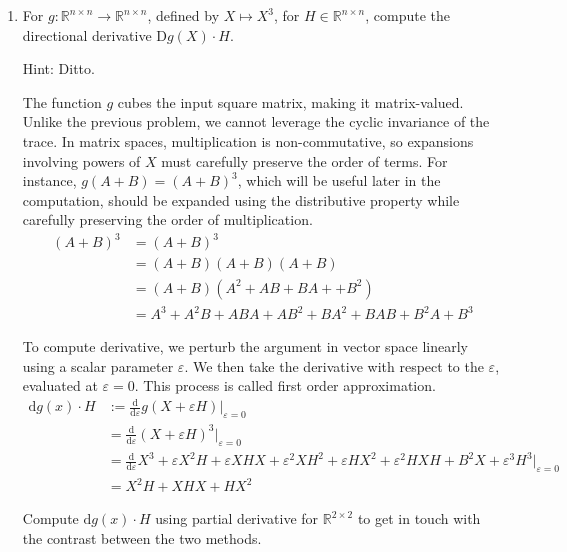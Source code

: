 \documentclass{article}
\begin{document}
\begin{enumerate}[start=9]
  \item For $g:\mathbb{R}^{n\times n}\rightarrow\mathbb{R}^{n\times n}$, defined by $X\mapsto X^{3}$, for $H\in\mathbb{R}^{n\times n}$, compute the directional derivative D$g(X)\cdot H$.

  {\footnotesize Hint: Ditto.}

  \begin{ans_box}
    The function $g$ cubes the input square matrix, making it matrix-valued. Unlike the previous problem, we cannot leverage the cyclic invariance of the trace. In matrix spaces, multiplication is non-commutative, so expansions involving powers of $X$ must carefully preserve the order of terms. For instance, $g(A+B)=(A+B)^{3}$, which will be useful later in the computation, should be expanded using the distributive property while carefully preserving the order of multiplication.\medskip
    \begin{equation*}
      \begin{split}
        \label{eqn:12a}
        (A+B)^{3}&=(A+B)^{3}\\
        &=(A+B)(A+B)(A+B)\\
        &=(A+B)(A^{2}+AB+BA++B^{2})\\
        &=A^{3}+A^{2}B+ABA+AB^{2}+BA^{2}+BAB+B^{2}A+B^{3}
      \end{split}
    \end{equation*}

    To compute derivative, we perturb the argument in vector space linearly using a scalar parameter $\varepsilon$. We then take the derivative with respect to the $\varepsilon$, evaluated at $\varepsilon=0$. This process is called first order approximation.
  \begin{equation*}
    \begin{split}
      \text{d}g(x)\cdot H&:=\frac{\text{d}}{\text{d}\varepsilon}g(X+\varepsilon H)\bigg|_{\varepsilon=0}\\
      &=\frac{\text{d}}{\text{d}\varepsilon}(X+\varepsilon H)^{3}\bigg|_{\varepsilon=0}\\
      &=\frac{\text{d}}{\text{d}\varepsilon}X^{3}+\varepsilon X^{2}H+\varepsilon XHX+\varepsilon^{2} XH^{2}+
      \varepsilon HX^{2}+\varepsilon^{2}HXH+B^{2}X+\varepsilon^{3}H^{3}\bigg|_{\varepsilon=0}\\
      &=X^{2}H+XHX+HX^{2}
    \end{split}
  \end{equation*}
  \end{ans_box}

  Compute $\text{d}g(x)\cdot H$ using partial derivative for $\mathbb{R}^{2\times2}$ to get in touch with the contrast between the two methods.
\end{enumerate}
\end{document}
